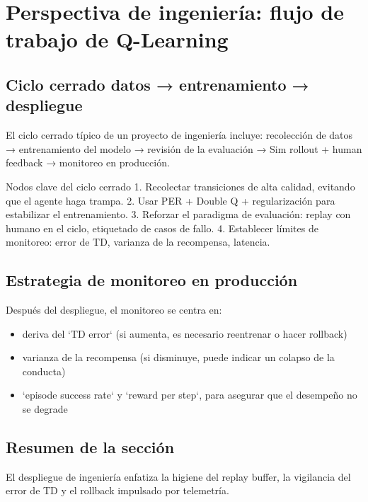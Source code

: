 \section{Perspectiva de ingeniería: flujo de trabajo de Q-Learning}

\subsection{Ciclo cerrado datos → entrenamiento → despliegue}

El ciclo cerrado típico de un proyecto de ingeniería incluye: recolección de datos → entrenamiento del modelo → revisión de la evaluación → Sim rollout + human feedback → monitoreo en producción.

\begin{importantbox}{Nodos clave del ciclo cerrado}
1. Recolectar transiciones de alta calidad, evitando que el agente haga trampa. 2. Usar PER + Double Q + regularización para estabilizar el entrenamiento. 3. Reforzar el paradigma de evaluación: replay con humano en el ciclo, etiquetado de casos de fallo. 4. Establecer límites de monitoreo: error de TD, varianza de la recompensa, latencia.
\end{importantbox}

\subsection{Estrategia de monitoreo en producción}

Después del despliegue, el monitoreo se centra en:

\begin{itemize}
    \item deriva del `TD error` (si aumenta, es necesario reentrenar o hacer rollback)
    \item varianza de la recompensa (si disminuye, puede indicar un colapso de la conducta)
    \item `episode success rate` y `reward per step`, para asegurar que el desempeño no se degrade
\end{itemize}

\subsection{Resumen de la sección}

El despliegue de ingeniería enfatiza la higiene del replay buffer, la vigilancia del error de TD y el rollback impulsado por telemetría.

